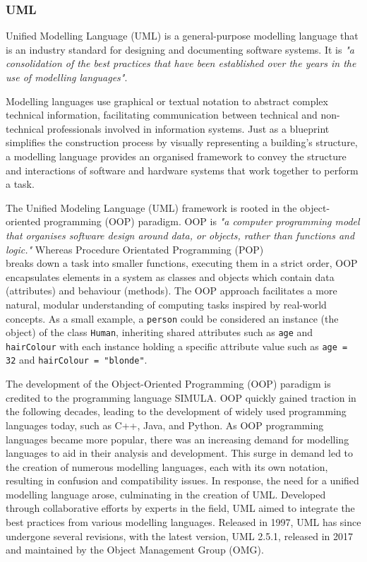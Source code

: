 \documentclass{article}
\begin{document}
{\subsubsection{UML}

Unified Modelling Language (UML) is a general-purpose modelling language that is an industry standard for designing and documenting software systems. It is \textit{"a consolidation of the best practices that have been established over the years in the use of modelling languages"}\cite{Seidl_Scholz_Huemer_Kappel_Duffy_2014}.

Modelling languages use graphical or textual notation to abstract complex technical information, facilitating communication between technical and non-technical professionals involved in information systems. Just as a blueprint simplifies the construction process by visually representing a building’s structure, a modelling language provides an organised framework to convey the structure and interactions of software and hardware systems that work together to perform a task\cite{Seidl_Scholz_Huemer_Kappel_Duffy_2014}.

The Unified Modeling Language (UML) framework is rooted in the object-oriented programming (OOP) paradigm. OOP is \textit{"a computer programming model that organises software design around data, or objects, rather than functions and logic."}\cite{TechTargetOOP} Whereas Procedure Orientated Programming (POP)\\ breaks down a task into smaller functions, executing them in a strict order, OOP encapsulates elements in a system as classes and objects which contain data (attributes) and behaviour (methods)\cite{OOPPOP}. The OOP approach facilitates a more natural, modular understanding of computing tasks inspired by real-world concepts\cite{Seidl_Scholz_Huemer_Kappel_Duffy_2014}. As a small example, a \texttt{person} could be considered an instance (the object) of the class \texttt{Human}, inheriting shared attributes such as \texttt{age} and \texttt{hairColour} with each instance holding a specific attribute value such as \texttt{age = 32} and \texttt{hairColour = "blonde"}.

The development of the Object-Oriented Programming (OOP) paradigm is credited to the programming language SIMULA\cite{329756}. OOP quickly gained traction in the following decades, leading to the development of widely used programming languages today, such as C++, Java, and Python\cite{Seidl_Scholz_Huemer_Kappel_Duffy_2014}. As OOP programming languages became more popular, there was an increasing demand for modelling languages to aid in their analysis and development. This surge in demand led to the creation of numerous modelling languages, each with its own notation, resulting in confusion and compatibility issues\cite{Seidl_Scholz_Huemer_Kappel_Duffy_2014}. In response, the need for a unified modelling language arose, culminating in the creation of UML. Developed through collaborative efforts by experts in the field, UML aimed to integrate the best practices from various modelling languages\cite{Seidl_Scholz_Huemer_Kappel_Duffy_2014}. Released in 1997, UML has since undergone several revisions, with the latest version, UML 2.5.1, released in 2017 and maintained by the Object Management Group (OMG)\cite{OMG_UML}.

}
\end{document}
